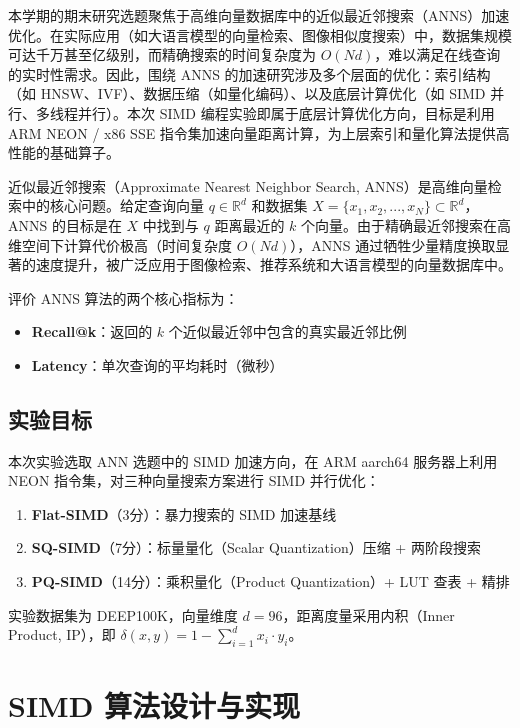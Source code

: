 \documentclass[a4paper]{article}
\begin{document}
本学期的期末研究选题聚焦于高维向量数据库中的近似最近邻搜索（ANNS）加速优化。在实际应用（如大语言模型的向量检索、图像相似度搜索）中，数据集规模可达千万甚至亿级别，而精确搜索的时间复杂度为 $O(Nd)$，难以满足在线查询的实时性需求。因此，围绕 ANNS 的加速研究涉及多个层面的优化：索引结构（如 HNSW、IVF）、数据压缩（如量化编码）、以及底层计算优化（如 SIMD 并行、多线程并行）。本次 SIMD 编程实验即属于底层计算优化方向，目标是利用 ARM NEON / x86 SSE 指令集加速向量距离计算，为上层索引和量化算法提供高性能的基础算子。

近似最近邻搜索（Approximate Nearest Neighbor Search, ANNS）是高维向量检索中的核心问题。给定查询向量 $q \in \mathbb{R}^d$ 和数据集 $X = \{x_1, x_2, ..., x_N\} \subset \mathbb{R}^d$，ANNS 的目标是在 $X$ 中找到与 $q$ 距离最近的 $k$ 个向量。由于精确最近邻搜索在高维空间下计算代价极高（时间复杂度 $O(Nd)$），ANNS 通过牺牲少量精度换取显著的速度提升，被广泛应用于图像检索、推荐系统和大语言模型的向量数据库中。

评价 ANNS 算法的两个核心指标为：
\begin{itemize}
  \item \textbf{Recall@k}：返回的 $k$ 个近似最近邻中包含的真实最近邻比例
  \item \textbf{Latency}：单次查询的平均耗时（微秒）
\end{itemize}

\subsection{实验目标}

本次实验选取 ANN 选题中的 SIMD 加速方向，在 ARM aarch64 服务器上利用 NEON 指令集，对三种向量搜索方案进行 SIMD 并行优化：
\begin{enumerate}
  \item \textbf{Flat-SIMD}（3分）：暴力搜索的 SIMD 加速基线
  \item \textbf{SQ-SIMD}（7分）：标量量化（Scalar Quantization）压缩 + 两阶段搜索
  \item \textbf{PQ-SIMD}（14分）：乘积量化（Product Quantization）+ LUT 查表 + 精排
\end{enumerate}

实验数据集为 DEEP100K，向量维度 $d=96$，距离度量采用内积（Inner Product, IP），即 $\delta(x, y) = 1 - \sum_{i=1}^{d} x_i \cdot y_i$。

\section{SIMD 算法设计与实现}
\end{document}
